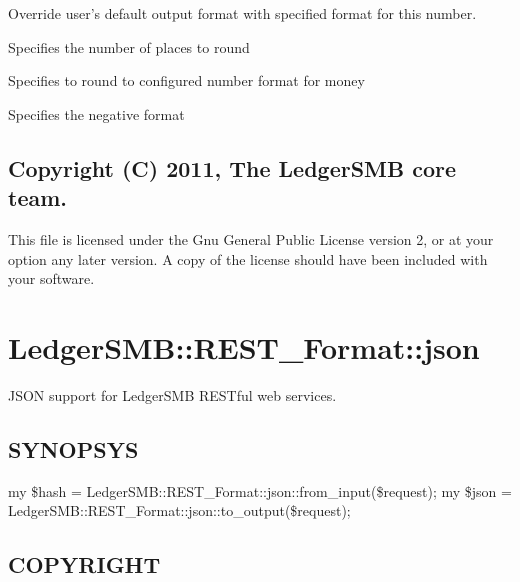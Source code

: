 \begin{description}
\begin{description}
\begin{description}
\begin{description}
\begin{description}
\begin{description}
\begin{description}
\begin{description}
\begin{description}
\begin{description}
\begin{description}
\begin{description}
Override user's default output format with specified format for this number.


\item[{places}] \mbox{}

Specifies the number of places to round


\item[{money}] \mbox{}

Specifies to round to configured number format for money


\item[{neg\_format}] \mbox{}

Specifies the negative format


\item[{locale}] \mbox{}\end{description}

\item[{from\_db}] \mbox{}
\item[{to\_db}] \mbox{}\end{description}
\subsection*{Copyright (C) 2011, The LedgerSMB core team.\label{LedgerSMB::PGNumeric_Copyright_C_2011_The_LedgerSMB_core_team_}}


This file is licensed under the Gnu General Public License version 2, or at your
option any later version.  A copy of the license should have been included with
your software.

\section{LedgerSMB::REST\_Format::json\label{LedgerSMB::REST_Format::json}}


JSON support for LedgerSMB RESTful web services.

\subsection*{SYNOPSYS\label{LedgerSMB::REST_Format::json_SYNOPSYS}}


my \$hash = LedgerSMB::REST\_Format::json::from\_input(\$request);
my \$json = LedgerSMB::REST\_Format::json::to\_output(\$request);

\subsection*{COPYRIGHT\label{LedgerSMB::REST_Format::json_COPYRIGHT}}



\end{description}
\end{description}
\end{description}
\end{description}
\end{description}
\end{description}
\end{description}
\end{description}
\end{description}
\end{description}
